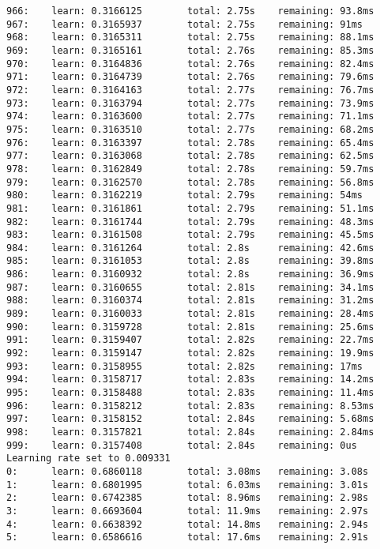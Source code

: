 \documentclass[11pt]{article}
\begin{document}
\begin{Verbatim}[commandchars=\\\{\}]
966:    learn: 0.3166125        total: 2.75s    remaining: 93.8ms
967:    learn: 0.3165937        total: 2.75s    remaining: 91ms
968:    learn: 0.3165311        total: 2.75s    remaining: 88.1ms
969:    learn: 0.3165161        total: 2.76s    remaining: 85.3ms
970:    learn: 0.3164836        total: 2.76s    remaining: 82.4ms
971:    learn: 0.3164739        total: 2.76s    remaining: 79.6ms
972:    learn: 0.3164163        total: 2.77s    remaining: 76.7ms
973:    learn: 0.3163794        total: 2.77s    remaining: 73.9ms
974:    learn: 0.3163600        total: 2.77s    remaining: 71.1ms
975:    learn: 0.3163510        total: 2.77s    remaining: 68.2ms
976:    learn: 0.3163397        total: 2.78s    remaining: 65.4ms
977:    learn: 0.3163068        total: 2.78s    remaining: 62.5ms
978:    learn: 0.3162849        total: 2.78s    remaining: 59.7ms
979:    learn: 0.3162570        total: 2.78s    remaining: 56.8ms
980:    learn: 0.3162219        total: 2.79s    remaining: 54ms
981:    learn: 0.3161861        total: 2.79s    remaining: 51.1ms
982:    learn: 0.3161744        total: 2.79s    remaining: 48.3ms
983:    learn: 0.3161508        total: 2.79s    remaining: 45.5ms
984:    learn: 0.3161264        total: 2.8s     remaining: 42.6ms
985:    learn: 0.3161053        total: 2.8s     remaining: 39.8ms
986:    learn: 0.3160932        total: 2.8s     remaining: 36.9ms
987:    learn: 0.3160655        total: 2.81s    remaining: 34.1ms
988:    learn: 0.3160374        total: 2.81s    remaining: 31.2ms
989:    learn: 0.3160033        total: 2.81s    remaining: 28.4ms
990:    learn: 0.3159728        total: 2.81s    remaining: 25.6ms
991:    learn: 0.3159407        total: 2.82s    remaining: 22.7ms
992:    learn: 0.3159147        total: 2.82s    remaining: 19.9ms
993:    learn: 0.3158955        total: 2.82s    remaining: 17ms
994:    learn: 0.3158717        total: 2.83s    remaining: 14.2ms
995:    learn: 0.3158488        total: 2.83s    remaining: 11.4ms
996:    learn: 0.3158212        total: 2.83s    remaining: 8.53ms
997:    learn: 0.3158152        total: 2.84s    remaining: 5.68ms
998:    learn: 0.3157821        total: 2.84s    remaining: 2.84ms
999:    learn: 0.3157408        total: 2.84s    remaining: 0us
Learning rate set to 0.009331
0:      learn: 0.6860118        total: 3.08ms   remaining: 3.08s
1:      learn: 0.6801995        total: 6.03ms   remaining: 3.01s
2:      learn: 0.6742385        total: 8.96ms   remaining: 2.98s
3:      learn: 0.6693604        total: 11.9ms   remaining: 2.97s
4:      learn: 0.6638392        total: 14.8ms   remaining: 2.94s
5:      learn: 0.6586616        total: 17.6ms   remaining: 2.91s

\end{Verbatim}
\end{document}
